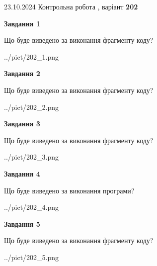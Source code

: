 \documentclass[12pt, ukrainian]{article}
\begin{document}
{\Large{23.10.2024 Контрольна робота , варіант  \No \textbf { 202 }\par}}
{
\begin {large}
{\begin {center}\textbf{Завдання 1}\end {center}}

Що буде виведено за виконання фрагменту коду?\par
\begin{center}
	{../pict/202_1.png}
\end{center}
\newpage

{\begin {center}\textbf{Завдання 2}\end {center}}

Що буде виведено за виконання фрагменту коду?\par
\begin{center}
	{../pict/202_2.png}
\end{center}
\newpage

{\begin {center}\textbf{Завдання 3}\end {center}}

Що буде виведено за виконання фрагменту коду?\par
\begin{center}
	{../pict/202_3.png}
\end{center}
\newpage

{\begin {center}\textbf{Завдання 4}\end {center}}

Що буде виведено за виконання програми?\par
\begin{center}
	{../pict/202_4.png}
\end{center}
\newpage

{\begin {center}\textbf{Завдання 5}\end {center}}

Що буде виведено за виконання фрагменту коду?\par
\begin{center}
	{../pict/202_5.png}
\end{center}
\newpage


\end{large}}
\end{document}

